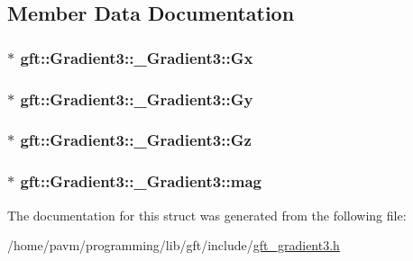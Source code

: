 \subsection{Member Data Documentation}
\hypertarget{structgft_1_1Gradient3_1_1__Gradient3_a0f0004e4f69ca93c57dbdd5ef750b673}{
\subsubsection[{Gx}]{$\ast$ gft\-::\-Gradient3\-::\-\_\-\-Gradient3\-::\-Gx}}\label{structgft_1_1Gradient3_1_1__Gradient3_a0f0004e4f69ca93c57dbdd5ef750b673}
\hypertarget{structgft_1_1Gradient3_1_1__Gradient3_ae929510403073f2e3398652e1caeb9ca}{
\subsubsection[{Gy}]{$\ast$ gft\-::\-Gradient3\-::\-\_\-\-Gradient3\-::\-Gy}}\label{structgft_1_1Gradient3_1_1__Gradient3_ae929510403073f2e3398652e1caeb9ca}
\hypertarget{structgft_1_1Gradient3_1_1__Gradient3_a565c66b7cb3f64c121a40149132508f7}{
\subsubsection[{Gz}]{$\ast$ gft\-::\-Gradient3\-::\-\_\-\-Gradient3\-::\-Gz}}\label{structgft_1_1Gradient3_1_1__Gradient3_a565c66b7cb3f64c121a40149132508f7}
\hypertarget{structgft_1_1Gradient3_1_1__Gradient3_adb0a7878ed7937b3112430914f40ed2d}{
\subsubsection[{mag}]{$\ast$ gft\-::\-Gradient3\-::\-\_\-\-Gradient3\-::mag}}\label{structgft_1_1Gradient3_1_1__Gradient3_adb0a7878ed7937b3112430914f40ed2d}


The documentation for this struct was generated from the following file\-:\begin{DoxyCompactItemize}
\item 
/home/pavm/programming/lib/gft/include/\hyperlink{gft__gradient3_8h}{gft\-\_\-gradient3.\-h}\end{DoxyCompactItemize}
